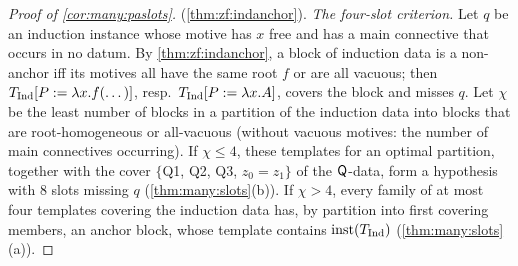 \begin{proof}[Proof of \cref{cor:many:paslots}]
(\cref{thm:zf:indanchor}).
\emph{The four-slot criterion.} Let $q$ be an induction instance whose motive has $x$ free and has a main connective that
occurs in no datum. By \cref{thm:zf:indanchor}, a block of induction data is a non-anchor iff its motives all have the same
root $f$ or are all vacuous; then $T_{\mathrm{Ind}}[P:=\lambda x.f(\dots)]$, resp.\ $T_{\mathrm{Ind}}[P:=\lambda x.A]$, covers the block and
misses $q$. Let $\chi$ be the least number of blocks in a partition of the induction data into blocks that are
root-homogeneous or all-vacuous (without vacuous motives: the number of main connectives occurring). If $\chi\le4$, these
templates for an optimal partition, together with the cover $\{$Q1, Q2, Q3, $z_0=z_1\}$ of the $\mathsf{Q}$-data, form a hypothesis
with $8$ slots missing $q$ (\cref{thm:many:slots}(b)). If $\chi>4$, every family of at most four templates covering the
induction data has, by partition into first covering members, an anchor block, whose template contains $\mathrm{inst}(T_{\mathrm{Ind}})$
(\cref{thm:many:slots}(a)).
\end{proof}

